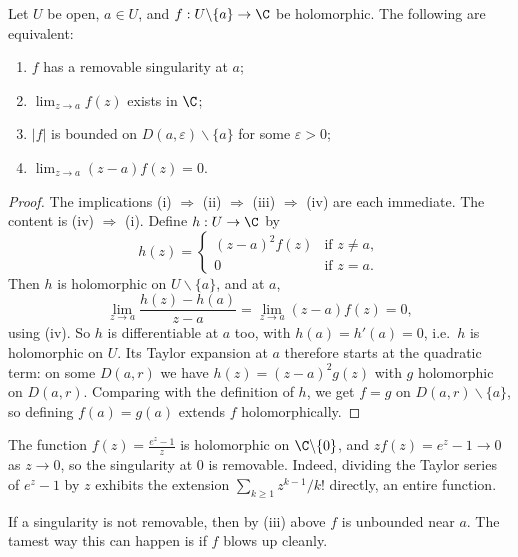 \begin{proposition}
    Let $U$ be open, $a \in U$, and $f: U \backslash \{a\} \rightarrow \C$ be holomorphic. The following are equivalent:
    \begin{enumerate}[label=(\roman*)]
        \item $f$ has a removable singularity at $a$;
        \item $\lim_{z \to a} f(z)$ exists in $\C$;
        \item $|f|$ is bounded on $D(a, \varepsilon) \backslash \{a\}$ for some $\varepsilon > 0$;
        \item $\lim_{z \to a} (z - a)f(z) = 0$.
    \end{enumerate}
\end{proposition}
\begin{proof}
    The implications (i) $\Rightarrow$ (ii) $\Rightarrow$ (iii) $\Rightarrow$ (iv) are each immediate. The content is (iv) $\Rightarrow$ (i). Define $h: U \rightarrow \C$ by
    $$
    h(z) = \begin{cases}
        (z - a)^2 f(z) &\mbox{if } z \neq a, \\
        0 &\mbox{if } z = a.
       \end{cases}
    $$
    Then $h$ is holomorphic on $U \backslash \{a\}$, and at $a$,
    $$
    \lim_{z \to a} \frac{h(z) - h(a)}{z - a} = \lim_{z \to a}(z - a)f(z) = 0,
    $$
    using (iv). So $h$ is differentiable at $a$ too, with $h(a) = h'(a) = 0$, i.e.\ $h$ is holomorphic on $U$. Its Taylor expansion at $a$ therefore starts at the quadratic term: on some $D(a, r)$ we have $h(z) = (z - a)^2 g(z)$ with $g$ holomorphic on $D(a, r)$. Comparing with the definition of $h$, we get $f = g$ on $D(a, r) \backslash \{a\}$, so defining $f(a) = g(a)$ extends $f$ holomorphically.
\end{proof}

\begin{example}
    The function $f(z) = \frac{e^z - 1}{z}$ is holomorphic on $\C \backslash \{0\}$, and $z f(z) = e^z - 1 \rightarrow 0$ as $z \rightarrow 0$, so the singularity at $0$ is removable. Indeed, dividing the Taylor series of $e^z - 1$ by $z$ exhibits the extension $\sum_{k \geq 1} z^{k - 1}/k!$ directly, an entire function.
\end{example}

If a singularity is not removable, then by (iii) above $f$ is unbounded near $a$. The tamest way this can happen is if $f$ blows up cleanly.

